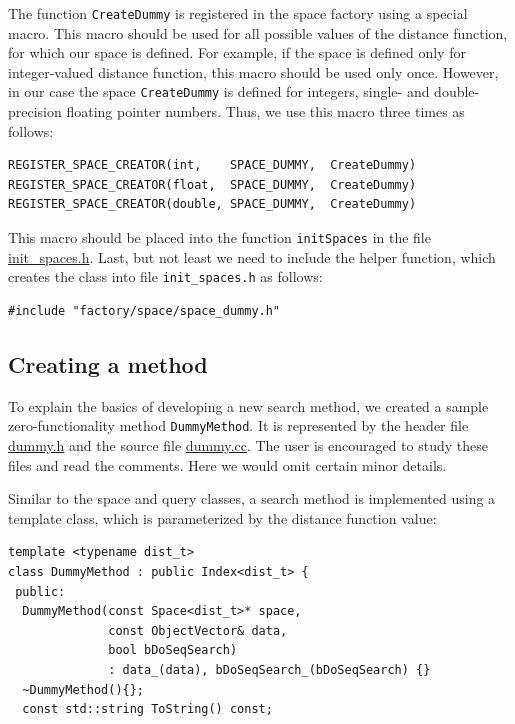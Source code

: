 \documentclass[runningheads,a4paper]{llncs}
\newcommand{\ttt}[1]{\texttt{#1}}
\begin{document}
{The function \ttt{CreateDummy} is registered in the space factory using a special macro.
This macro should be used for all possible values of the distance function,
for which our space is defined. For example, if the space is defined
only for integer-valued distance function, this macro should be used only once.
However, in our case the space \ttt{CreateDummy} is defined for integers,
single- and double-precision floating pointer numbers. Thus, we use this macro
three times as follows:
\begin{verbatim}
REGISTER_SPACE_CREATOR(int,    SPACE_DUMMY,  CreateDummy)
REGISTER_SPACE_CREATOR(float,  SPACE_DUMMY,  CreateDummy)
REGISTER_SPACE_CREATOR(double, SPACE_DUMMY,  CreateDummy)
\end{verbatim}

This macro should be placed into the function \texttt{initSpaces} in the 
file 
\href{https://github.com/searchivarius/NonMetricSpaceLib/blob/master/similarity_search/include/factory/init\_spaces.h}{init\_spaces.h}.
Last, but not least we need to include the helper function, which creates
the class into file \texttt{init\_spaces.h} as follows:
\begin{verbatim}
#include "factory/space/space_dummy.h"
\end{verbatim}

\subsection{Creating a method}\label{SectionCreateMethod}
To explain the basics of developing a new search method,
we created a sample zero-functionality method \texttt{DummyMethod}.
It is represented by 
the header file 
\href{https://github.com/searchivarius/NonMetricSpaceLib/blob/master/similarity_search/include/method/dummy.h}{dummy.h}
and the source file
\href{https://github.com/searchivarius/NonMetricSpaceLib/blob/master/similarity_search/src/method/dummy.cc}{dummy.cc}.
The user is encouraged to study these files and read the comments.
Here we would omit certain minor details.

Similar to the space and query classes, a search method is implemented using
a template class, which is parameterized by the distance function value:

\newpage
\begin{verbatim}
template <typename dist_t>
class DummyMethod : public Index<dist_t> {
 public:
  DummyMethod(const Space<dist_t>* space,
              const ObjectVector& data, 
              bool bDoSeqSearch)
              : data_(data), bDoSeqSearch_(bDoSeqSearch) {}
  ~DummyMethod(){};
  const std::string ToString() const;
   

\end{verbatim}}
\end{document}
